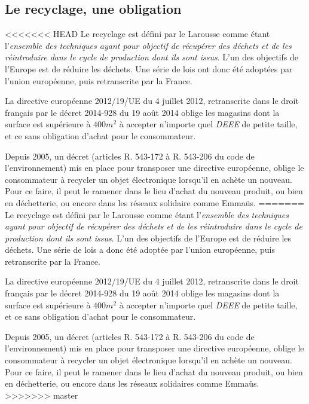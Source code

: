 \subsection{Le recyclage, une obligation}

<<<<<<< HEAD
Le recyclage est défini par le Larousse  comme étant l'\og{}\textit{ensemble des techniques ayant pour objectif de récupérer des déchets et de les réintroduire dans le cycle de production dont ils sont issus}\fg{}. L'un des objectifs de l'Europe est de réduire les déchets. Une série de lois ont donc été adoptées par l'union européenne, puis retranscrite par la France. 

La directive européenne 2012/19/UE du 4 juillet 2012, retranscrite dans le droit français par le décret 2014-928 du 19 août 2014 oblige  les magasins dont la surface est supérieure à $400m^2$ à accepter n'importe quel \textit{DEEE} de petite taille, et ce sans obligation d'achat pour le consommateur. 

Depuis 2005, un décret (articles R. 543-172 à R. 543-206 du code de l'environnement) mis en place pour transposer%
 une directive européenne, oblige le consommateur à recycler un objet électronique lorsqu'il en achète un nouveau. Pour ce faire, il peut le ramener dans le lieu d'achat du nouveau produit, ou bien en déchetterie, ou encore dans les réseaux solidaire comme Emmaüs.
=======
Le recyclage est défini par le Larousse  comme étant l'\og{}\textit{ensemble des techniques ayant pour objectif de récupérer des déchets et de les réintroduire dans le cycle de production dont ils sont issus}\fg{}. L'un des objectifs de l'Europe est de réduire les déchets. Une série de lois a donc été adoptée par l'union européenne, puis retranscrite par la France. 

La directive européenne 2012/19/UE du 4 juillet 2012, retranscrite dans le droit français par le décret 2014-928 du 19 août 2014 oblige  les magasins dont la surface est supérieure à $400m^2$ à accepter n'importe quel \textit{DEEE} de petite taille, et ce sans obligation d'achat pour le consommateur. 

Depuis 2005, un décret (articles R. 543-172 à R. 543-206 du code de l'environnement) mis en place pour transposer %
 une directive européenne, oblige le consommateur à recycler un objet électronique lorsqu'il en achète un nouveau. Pour ce faire, il peut le ramener dans le lieu d'achat du nouveau produit, ou bien en déchetterie, ou encore dans les réseaux solidaires comme Emmaüs.
>>>>>>> master


